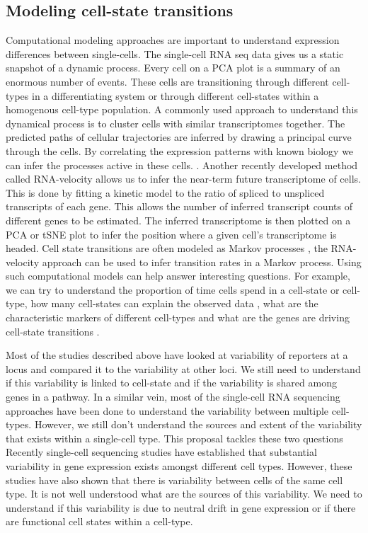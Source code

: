 \subsection{Modeling cell-state transitions}

Computational modeling approaches are important to understand expression differences between single-cells. The single-cell RNA seq data gives us a static snapshot of a dynamic process. Every cell on a PCA plot is a summary of an enormous number of events. These cells are transitioning through different cell-types in a differentiating system or through different cell-states within a homogenous cell-type population. A commonly used approach to understand this dynamical process is to cluster cells with similar transcriptomes together. The predicted paths of cellular trajectories are inferred by drawing a principal curve through the cells. By correlating the expression patterns with known biology we can infer the processes active in these cells. \cite{trapnell_dynamics_2014}. Another recently developed method called RNA-velocity allows us to infer the near-term future transcriptome of cells. This is done by fitting a kinetic model to the ratio of spliced to unspliced transcripts of each gene. This allows the number of inferred transcript counts of different genes to be estimated. The inferred transcriptome is then plotted on a PCA or tSNE plot to infer the position where a given cell's transcriptome is headed.  \cite{manno_rna_2018} Cell state transitions are often modeled as Markov processes \cite{stumpf_stem_2017}, the RNA-velocity approach can be used to infer transition rates in a Markov process. Using such computational models can help answer interesting questions. For example, we can try to understand the proportion of time cells spend in a cell-state or cell-type, how many cell-states can explain the observed data  \cite{chang_transcriptome-wide_2008}, what are the characteristic markers of different cell-types and what are the genes are driving cell-state transitions \cite{furchtgott_discovering_2017}.

Most of the studies described above have looked at variability of reporters at a locus and compared it to the variability at other loci. We still need to understand if this variability is linked to cell-state and if the variability is shared among genes in a pathway. In a similar vein, most of the single-cell RNA sequencing approaches have been done to understand the variability between multiple cell-types. However, we still don't understand the sources and extent of the variability that exists within a single-cell type. This proposal tackles these two questions
Recently single-cell sequencing studies have established that substantial variability in gene expression exists amongst different cell types. However, these studies have also shown that there is variability between cells of the same cell type. It is not well understood what are the sources of this variability. We need to understand if this variability is due to neutral drift in gene expression or if there are functional cell states within a cell-type.
